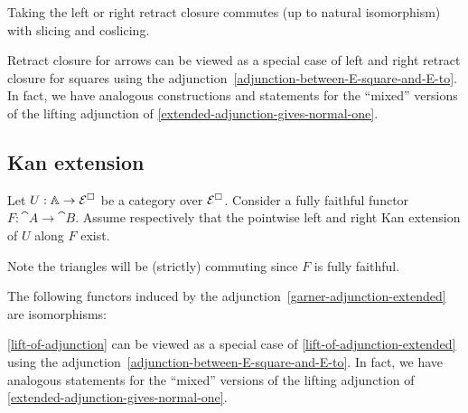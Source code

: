 \documentclass[reqno,10pt,a4paper,oneside]{amsart}
\begin{document}
\begin{remark}
\label{retract-closure-extended-slicing}
Taking the left or right retract closure commutes (up to natural isomorphism) with slicing and coslicing.
\end{remark}

\begin{remark}
\label{slicing-mixed}
Retract closure for arrows can be viewed as a special case of left and right retract closure for squares using the adjunction~\eqref{adjunction-between-E-square-and-E-to}.
In fact, we have analogous constructions and statements for the ``mixed'' versions of the lifting adjunction of \cref{extended-adjunction-gives-normal-one}.
\end{remark}

\subsection{Kan extension}

Let $U : \mathbb{A} \to \mathcal{E}^{\Box}$ be a category over $\mathcal{E}^{\Box}$.
Consider a fully faithful functor $F : \cat{A} \to \cat{B}$.
Assume respectively that the pointwise left and right Kan extension of $U$ along $F$ exist.
Note the triangles will be (strictly) commuting since $F$ is fully faithful.

\begin{lemma}
\label{kan-extension-closure-extended}
The following functors induced by the adjunction~\eqref{garner-adjunction-extended} are isomorphisms:
\end{lemma}

\begin{remark}
\label{kan-extension-closure-mixed}
\cref{lift-of-adjunction} can be viewed as a special case of \cref{lift-of-adjunction-extended} using the adjunction~\eqref{adjunction-between-E-square-and-E-to}.
In fact, we have analogous statements for the ``mixed'' versions of the lifting adjunction of \cref{extended-adjunction-gives-normal-one}.
\end{remark}






\end{document}
